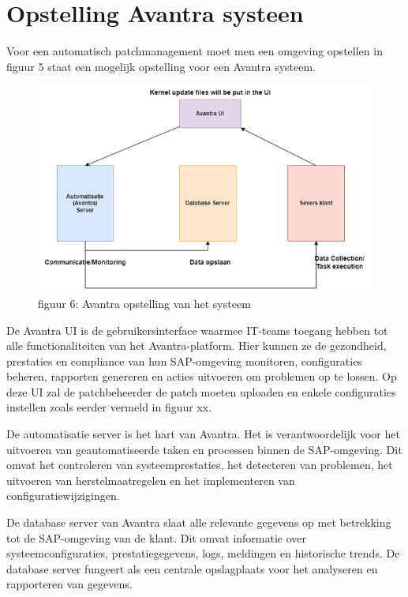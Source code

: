\documentclass[dutch,dit,thesis]{hogentreport}
\begin{document}
\section{Opstelling Avantra systeen}
Voor een automatisch patchmanagement moet men een omgeving opstellen in figuur 5 staat een mogelijk opstelling voor een Avantra systeem. 
\begin{figure}[htbp]
    \centering
    \includegraphics[width=\textwidth]{avantra4.png}
    \caption{figuur 6: Avantra opstelling van het systeem}
     \label{fig:avantra1}
\end{figure}




De Avantra UI is de gebruikersinterface waarmee IT-teams toegang hebben tot alle functionaliteiten van het Avantra-platform. Hier kunnen ze de gezondheid, prestaties en compliance van hun SAP-omgeving 
monitoren, configuraties beheren, rapporten genereren en acties uitvoeren om problemen op te lossen. Op deze UI zal de patchbeheerder de patch moeten uploaden en enkele configuraties instellen zoals eerder vermeld in figuur xx.

De automatisatie server is het hart van Avantra. Het is verantwoordelijk voor het uitvoeren van geautomatiseerde taken en processen binnen de SAP-omgeving. Dit omvat het controleren van systeemprestaties, het detecteren
 van problemen, het uitvoeren van herstelmaatregelen en het implementeren van configuratiewijzigingen.

De database server van Avantra slaat alle relevante gegevens op met betrekking tot de SAP-omgeving van de klant. Dit omvat informatie over systeemconfiguraties, prestatiegegevens, logs, meldingen en historische
 trends. De database server fungeert als een centrale opslagplaats voor het analyseren en rapporteren van gegevens.
\end{document}
